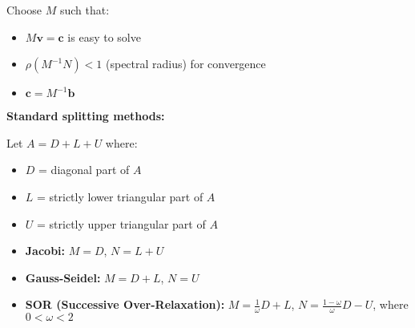 Choose $M$ such that:
\begin{itemize}
    \item $M\mathbf{v} = \mathbf{c}$ is easy to solve
    \item $\rho(M^{-1}N) < 1$ (spectral radius) for convergence
    \item $\mathbf{c} = M^{-1}\mathbf{b}$
\end{itemize}

\textbf{Standard splitting methods:}

Let $A = D + L + U$ where:
\begin{itemize}
    \item $D$ = diagonal part of $A$
    \item $L$ = strictly lower triangular part of $A$
    \item $U$ = strictly upper triangular part of $A$
\end{itemize}

\begin{itemize}
    \item \textbf{Jacobi:} $M = D$, $N = L + U$
    \item \textbf{Gauss-Seidel:} $M = D + L$, $N = U$
    \item \textbf{SOR (Successive Over-Relaxation):} $M = \frac{1}{\omega}D + L$, $N = \frac{1-\omega}{\omega}D - U$, where $0 < \omega < 2$
\end{itemize}




